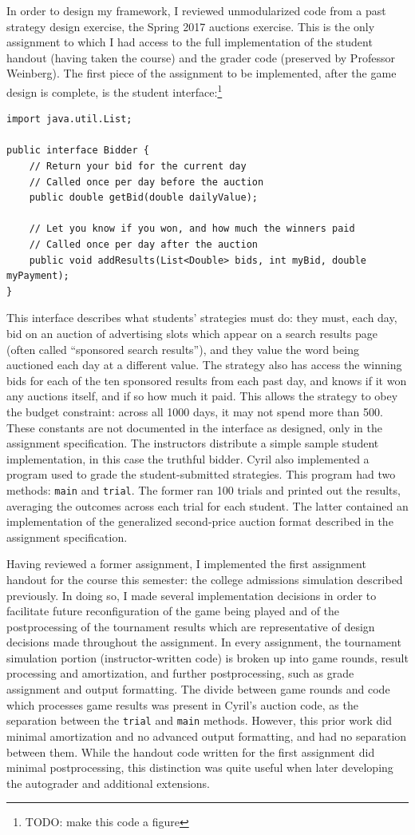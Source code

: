 \documentclass[pageno]{jpaper}
\begin{document}
In order to design my framework, I reviewed unmodularized code from a past strategy design exercise, the Spring 2017 auctions exercise.
This is the only assignment to which I had access to the full implementation of the student handout (having taken the course) and the grader code (preserved by Professor Weinberg).
The first piece of the assignment to be implemented, after the game design is complete, is the student interface:\footnote{TODO: make this code a figure}
\begin{verbatim}
import java.util.List;

public interface Bidder {
    // Return your bid for the current day
    // Called once per day before the auction
    public double getBid(double dailyValue);

    // Let you know if you won, and how much the winners paid
    // Called once per day after the auction
    public void addResults(List<Double> bids, int myBid, double myPayment);
}
\end{verbatim}
This interface describes what students' strategies must do: they must, each day, bid on an auction of advertising slots which appear on a search results page (often called ``sponsored search results''), and they value the word being auctioned each day at a different value.
The strategy also has access the winning bids for each of the ten sponsored results from each past day, and knows if it won any auctions itself, and if so how much it paid.
This allows the strategy to obey the budget constraint: across all 1000 days, it may not spend more than 500.
These constants are not documented in the interface as designed, only in the assignment specification.
The instructors distribute a simple sample student implementation, in this case the truthful bidder.
Cyril also implemented a program used to grade the student-submitted strategies.
This program had two methods: \texttt{main} and \texttt{trial}.
The former ran 100 trials and printed out the results, averaging the outcomes across each trial for each student.
The latter contained an implementation of the generalized second-price auction format described in the assignment specification.

Having reviewed a former assignment, I implemented the first assignment handout for the course this semester: the college admissions simulation described previously.
In doing so, I made several implementation decisions in order to facilitate future reconfiguration of the game being played and of the postprocessing of the tournament results which are representative of design decisions made throughout the assignment.
In every assignment, the tournament simulation portion (instructor-written code) is broken up into game rounds, result processing and amortization, and further postprocessing, such as grade assignment and output formatting.
The divide between game rounds and code which processes game results was present in Cyril's auction code, as the separation between the \texttt{trial} and \texttt{main} methods.
However, this prior work did minimal amortization and no advanced output formatting, and had no separation between them.
While the handout code written for the first assignment did minimal postprocessing, this distinction was quite useful when later developing the autograder and additional extensions.
\end{document}
